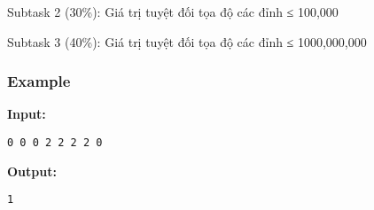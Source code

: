   Subtask 2 (30\%): Giá trị tuyệt đối tọa độ các đỉnh ≤ 100,000  

   Subtask 3 (40\%): Giá trị tuyệt đối tọa độ các đỉnh ≤ 1000,000,000  

\subsubsection{   Example  }

\textbf{    Input:   }
\begin{verbatim}
0 0 0 2 2 2 2 0
\end{verbatim}

\textbf{    Output:   }
\begin{verbatim}
1\end{verbatim}

